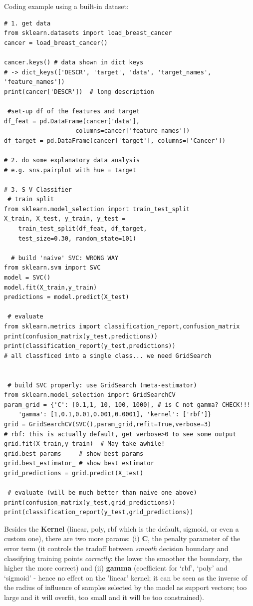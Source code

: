 \documentclass[11pt]{article}
\begin{document}
Coding example using a built-in dataset:
\begin{lstlisting}
# 1. get data
from sklearn.datasets import load_breast_cancer
cancer = load_breast_cancer()

cancer.keys() # data shown in dict keys
# -> dict_keys(['DESCR', 'target', 'data', 'target_names', 'feature_names'])
print(cancer['DESCR'])  # long description
 
 #set-up df of the features and target
df_feat = pd.DataFrame(cancer['data'], 
					columns=cancer['feature_names'])
df_target = pd.DataFrame(cancer['target'], columns=['Cancer'])

# 2. do some explanatory data analysis
# e.g. sns.pairplot with hue = target

# 3. S V Classifier
 # train split
from sklearn.model_selection import train_test_split
X_train, X_test, y_train, y_test = 
	train_test_split(df_feat, df_target, 
	test_size=0.30, random_state=101)
	
  # build 'naive' SVC: WRONG WAY
from sklearn.svm import SVC
model = SVC()
model.fit(X_train,y_train)
predictions = model.predict(X_test)

 # evaluate
from sklearn.metrics import classification_report,confusion_matrix
print(confusion_matrix(y_test,predictions))
print(classification_report(y_test,predictions))
# all classficed into a single class... we need GridSearch

 
 # build SVC properly: use GridSearch (meta-estimator)
from sklearn.model_selection import GridSearchCV
param_grid = {'C': [0.1,1, 10, 100, 1000], # is C not gamma? CHECK!!!
	'gamma': [1,0.1,0.01,0.001,0.0001], 'kernel': ['rbf']}  
grid = GridSearchCV(SVC(),param_grid,refit=True,verbose=3)	
# rbf: this is actually default, get verbose>0 to see some output
grid.fit(X_train,y_train)  # May take awhile!
grid.best_params_    # show best params
grid.best_estimator_ # show best estimator
grid_predictions = grid.predict(X_test)

 # evaluate (will be much better than naive one above)
print(confusion_matrix(y_test,grid_predictions))
print(classification_report(y_test,grid_predictions))
\end{lstlisting}
Besides the \textbf{Kernel} (linear, poly, rbf which is the default, sigmoid, or even a custom one), there are two more params: (i) \textbf{C}, the penalty parameter of the error term (it controls the tradoff between \textit{smooth} decision boundary and classifying training points \textit{correctly}: the lower the smoother the boundary, the higher the more correct) and (ii) \textbf{gamma} (coefficient for ‘rbf’, ‘poly’ and ‘sigmoid’ - hence no effect on the 'linear' kernel; it can be seen as the inverse of the radius of influence of samples selected by the model as support vectors; too large and it will overfit, too small and it will be too constrained).
\end{document}

